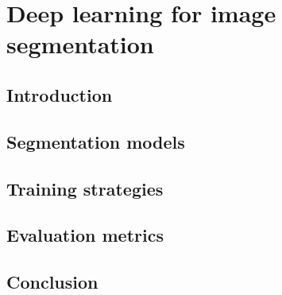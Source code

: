 
\chapter{Deep learning for image segmentation}\label{ch:deep_learning_seg}

\section{Introduction}

\section{Segmentation models}

\section{Training strategies}

\section{Evaluation metrics}

\section{Conclusion}
